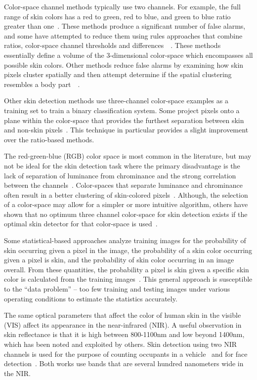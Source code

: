 \documentclass[10pt,journal,cspaper,compsoc]{IEEEtran}
\begin{document}
Color-space channel methods typically use two channels. For example, the full range of skin colors has a red to green, red to blue, 
and green to blue ratio greater than one~\cite{Brand1}.  These methods produce a significant number of false alarms, and some have 
attempted to reduce them using rules approaches that combine ratios, color-space channel thresholds and differences~\cite{Vezhnevets1}~\cite{Peer1}. 
These methods essentially define a volume of the 3-dimensional color-space which encompasses all possible skin colors. Other methods reduce false alarms by 
examining how skin pixels cluster spatially and then attempt determine if the spatial clustering resembles a body part~\cite{Fleck1}~\cite{Hsu1}.

Other skin detection methods use three-channel color-space examples as a training set to train a binary classification system.  Some 
project pixels onto a plane within the color-space that provides the furthest separation between skin and non-skin pixels~\cite{Brand1}.  
This technique in particular provides a slight improvement over the ratio-based methods.

The red-green-blue (RGB) color space is most common in the literature, but may not be ideal for the skin detection task where the primary 
disadvantage is the lack of separation of luminance from chrominance and the strong correlation between the channels~\cite{Vezhnevets1}.   
Color-spaces that separate luminance and chrominance often result in a better clustering of skin-colored pixels~\cite{Gomez1}.  Although, 
the selection of a color-space may allow for a simpler or more intuitive algorithm, others have shown that no optimum three channel 
color-space for skin detection exists if the optimal skin detector for that color-space is used~\cite{Albiol1}.

Some statistical-based approaches analyze training images for the probability of skin occurring given a pixel in the image, the probability 
of a skin color occurring given a pixel is skin, and the probability of skin color occurring in an image overall.  From these 
quantities, the probability a pixel is skin given a specific skin color is calculated from the training images~\cite{Brand1}.  This 
general approach is susceptible to the ``data problem'' -- too few training and testing images under various operating 
conditions to estimate the statistics accurately.

The same optical parameters that affect the color of human skin in the visible (VIS) affect its appearance in the near-infrared (NIR). A useful 
observation in skin reflectance is that it is high between 800-1100nm and low beyond 1400nm, which has been noted and exploited 
by others.  Skin detection using two NIR channels is used for the purpose of counting occupants in a vehicle~\cite{Pavlidis1} and 
for face detection~\cite{Dowdall1}.  Both works use bands that are several hundred nanometers wide in the NIR.
\end{document}
